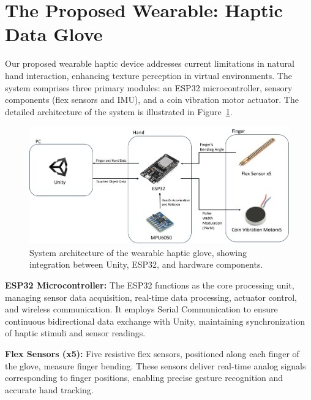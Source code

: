 \documentclass[graybox]{svmult}
\begin{document}
\section{The Proposed Wearable: Haptic Data Glove}\label{sec:shd}
Our proposed wearable haptic device addresses current limitations in natural hand interaction, enhancing texture perception in virtual environments. The system comprises three primary modules: an ESP32 microcontroller, sensory components (flex sensors and IMU), and a coin vibration motor actuator. The detailed architecture of the system is illustrated in Figure~\ref{fig:system_diagram}.

\begin{figure}\centering
	\includegraphics[width=1\textwidth]{figure/system diagram.png}%
	\caption{System architecture of the wearable haptic glove, showing integration between Unity, ESP32, and hardware components.}\label{fig:system_diagram}
\end{figure}
\textbf{ESP32 Microcontroller:}  
The ESP32 functions as the core processing unit, managing sensor data acquisition, real-time data processing, actuator control, and wireless communication. It employs Serial Communication to ensure continuous bidirectional data exchange with Unity, maintaining synchronization of haptic stimuli and sensor readings.

\textbf{Flex Sensors (x5):}  
Five resistive flex sensors, positioned along each finger of the glove, measure finger bending. These sensors deliver real-time analog signals corresponding to finger positions, enabling precise gesture recognition and accurate hand tracking.
\end{document}
